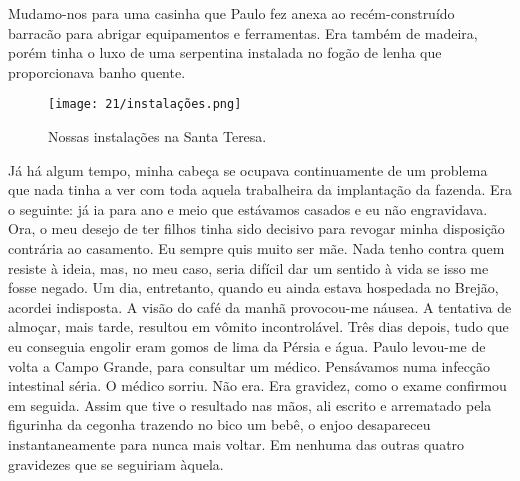 Mudamo-nos para uma casinha que Paulo fez anexa ao recém-construído barracão para abrigar equipamentos e ferramentas.
Era também de madeira, porém tinha o luxo de uma serpentina instalada no fogão de lenha que proporcionava banho quente.

\begin{figure}
\centering
\texttt{[image: 21/instalações.png]}
\caption{Nossas instalações na Santa Teresa.}
\end{figure}

Já há algum tempo, minha cabeça se ocupava continuamente de um problema que nada tinha a ver com toda aquela trabalheira da implantação da fazenda.
Era o seguinte: já ia para ano e meio que estávamos casados e eu não engravidava.
Ora, o meu desejo de ter filhos tinha sido decisivo para revogar minha disposição contrária ao casamento.
Eu sempre quis muito ser mãe.
Nada tenho contra quem resiste à ideia, mas, no meu caso, seria difícil dar um sentido à vida se isso me fosse negado.
Um dia, entretanto, quando eu ainda estava hospedada no Brejão, acordei indisposta.
A visão do café da manhã provocou-me náusea.
A tentativa de almoçar, mais tarde, resultou em vômito incontrolável.
Três dias depois, tudo que eu conseguia engolir eram gomos de lima da Pérsia e água.
Paulo levou-me de volta a Campo Grande, para consultar um médico.
Pensávamos numa infecção intestinal séria.
O médico sorriu.
Não era.
Era gravidez, como o exame confirmou em seguida.
Assim que tive o resultado nas mãos, ali escrito e arrematado pela figurinha da cegonha trazendo no bico um bebê, o enjoo desapareceu instantaneamente para nunca mais voltar.
Em nenhuma das outras quatro gravidezes que se seguiriam àquela.
